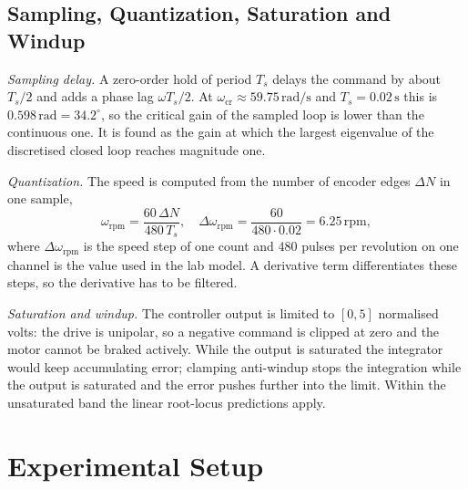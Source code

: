 \documentclass[lettersize,journal]{IEEEtran}
\newcommand{\Ts}{T_{\!s}}
\newcommand{\wcr}{\omega_{\mathrm{cr}}}
\newcommand{\rpm}{\,\text{rpm}}
\begin{document}
\subsection{Sampling, Quantization, Saturation and Windup}
\emph{Sampling delay.} A zero-order hold of period $\Ts$ delays the command by about $\Ts/2$ and adds a phase lag $\omega\Ts/2$. At $\wcr\approx59.75\,\text{rad/s}$ and $\Ts=0.02\,\text{s}$ this is $0.598\,\text{rad}=34.2^\circ$, so the critical gain of the sampled loop is lower than the continuous one. It is found as the gain at which the largest eigenvalue of the discretised closed loop reaches magnitude one.

\emph{Quantization.} The speed is computed from the number of encoder edges $\Delta N$ in one sample,
\begin{equation}
\omega_{\mathrm{rpm}}=\frac{60\,\Delta N}{480\,\Ts},\quad
\Delta\omega_{\mathrm{rpm}}=\frac{60}{480\cdot0.02}=6.25\rpm,
\label{eq:quant}
\end{equation}
where $\Delta\omega_{\mathrm{rpm}}$ is the speed step of one count and $480$ pulses per revolution on one channel is the value used in the lab model. A derivative term differentiates these steps, so the derivative has to be filtered.

\emph{Saturation and windup.} The controller output is limited to $[0,5]$ normalised volts: the drive is unipolar, so a negative command is clipped at zero and the motor cannot be braked actively. While the output is saturated the integrator would keep accumulating error; clamping anti-windup stops the integration while the output is saturated and the error pushes further into the limit. Within the unsaturated band the linear root-locus predictions apply.

\section{Experimental Setup}
\end{document}
